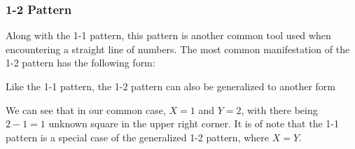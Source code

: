 \newpage
\subsubsection*{1-2 Pattern}
Along with the 1-1 pattern, this pattern is another common tool used when encountering a straight line of numbers. The most common manifestation of the 1-2 pattern has the following form:

\begin{center}
    \begin{minipage}{0.2\linewidth}\centering\resizebox{1\linewidth}{!}{\begin{minesweeperboard}
        \cellsafe \& \cellunk \& \cellunk \& \cellmine\\
        \celldc \& \cellone \& \celltwo \& \celldc\\
        \cellzero \& \cellzero \& \cellzero \& \cellzero\\
    \end{minesweeperboard}}\end{minipage}
\end{center}

Like the 1-1 pattern, the 1-2 pattern can also be generalized to another form


We can see that in our common case, $X=1$ and $Y=2$, with there being $2-1=1$ unknown square in the upper right corner. It is of note that the 1-1 pattern is a special case of the generalized 1-2 pattern, where $X=Y$.\\

